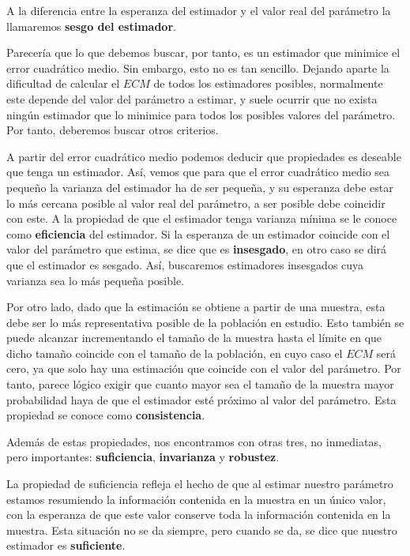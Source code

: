 A la diferencia entre la esperanza del estimador y el valor real del par\'ametro la llamaremos \textbf{sesgo del estimador}.

Parecer\'ia que lo que debemos buscar, por tanto, es un estimador que minimice el error cuadr\'atico medio. Sin embargo, esto no es tan sencillo. Dejando aparte la dificultad de calcular el $ECM$ de todos los estimadores posibles, normalmente este depende del valor del par\'ametro a estimar, y suele ocurrir que no exista ning\'un estimador que lo minimice para todos los posibles valores del par\'ametro. Por tanto, deberemos buscar otros criterios.

A partir del error cuadr\'atico medio podemos deducir que propiedades es deseable que tenga un estimador. As\'i, vemos que para que el error cuadr\'atico medio sea peque\~no la varianza del estimador ha de ser peque\~na, y su esperanza debe estar lo m\'as cercana posible al valor real del par\'ametro, a ser posible debe coincidir con este. A la propiedad de que el estimador tenga varianza m\'inima se le conoce como \textbf{eficiencia} del estimador. Si la esperanza de un estimador coincide con el valor del par\'ametro que estima, se dice que es \textbf{insesgado}, en otro caso se dir\'a que el estimador es sesgado. As\'i, buscaremos estimadores insesgados cuya varianza sea lo m\'as peque\~na posible.

Por otro lado, dado que la estimaci\'on se obtiene a partir de una muestra, esta debe ser lo m\'as representativa posible de la poblaci\'on en estudio. Esto tambi\'en se puede alcanzar incrementando el tama\~no de la muestra hasta el l\'imite en que dicho tama\~no coincide con el tama\~no de la poblaci\'on, en cuyo caso el $ECM$ ser\'a cero, ya que solo hay una estimaci\'on que coincide con el valor del par\'ametro. Por tanto, parece l\'ogico exigir que cuanto mayor sea el tama\~no de la muestra mayor probabilidad haya de que el estimador est\'e pr\'oximo al valor del par\'ametro. Esta propiedad se conoce como \textbf{consistencia}.

Adem\'as de estas propiedades, nos encontramos con otras tres, no inmediatas, pero importantes: \textbf{suficiencia}, \textbf{invarianza} y \textbf{robustez}.

La propiedad de suficiencia refleja el hecho de que al estimar nuestro par\'ametro estamos resumiendo la informaci\'on contenida en la muestra en un \'unico valor, con la esperanza de que este valor conserve toda la informaci\'on contenida en la muestra. Esta situaci\'on no se da siempre, pero cuando se da, se dice que nuestro estimador es \textbf{suficiente}.

